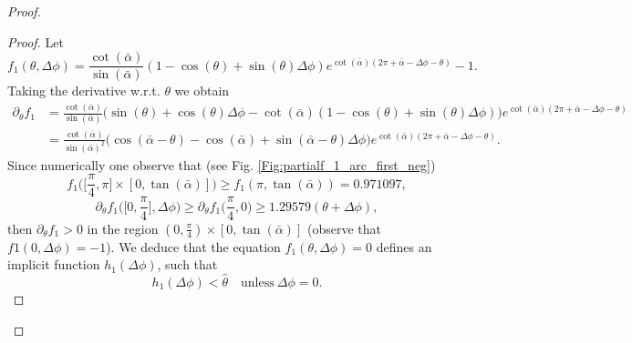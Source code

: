 \documentclass[reqno]{amsart}
\theoremstyle{definition} \newtheorem{definition}{Definition}[section]
\theoremstyle{definition} \newtheorem{remark}[definition]{Remark}
\theoremstyle{plain} \newtheorem{lemma}[definition]{Lemma}
\theoremstyle{plain} \newtheorem{proposition}[definition]{Proposition}
\theoremstyle{plain} \newtheorem{theorem}[definition]{Theorem}
\theoremstyle{plain} \newtheorem{corollary}[definition]{Corollary}
\theoremstyle{definition} \newtheorem{example}[definition]{Example}
\theoremstyle{plain} \newtheorem{claim}[clai]{Claim}
\theoremstyle{definition} \newtheorem{assumption}[definition]{Assumption}
\theoremstyle{definition} \newtheorem{observation}[definition]{Observation}
\newcommand{\1}{\mathbbm 1}
\numberwithin{equation}{section} %
\theoremstyle{plain} \newtheorem*{theorem*}{Theorem}
\theoremstyle{plain} \newtheorem{mthm}[maintheorem]{Main Theorem}
\theoremstyle{plain} \newtheorem*{mthm*}{Main Theorem}
\theoremstyle{plain} \newtheorem*{conjecture*}{Conjecture}
\theoremstyle{plain} \newtheorem{conjecture}[definition]{Conjecture}
\theoremstyle{plain} \newtheorem*{problem*}{Problem}
\begin{document}
\begin{proof}
\begin{proof}
Let
\begin{equation}
\label{Equa:f_1_arc_first_neg}
f_1(\theta,\Delta \phi) = \frac{\cot(\bar \alpha)}{\sin(\bar \alpha)} (1 - \cos(\theta) + \sin(\theta) \Delta \phi) e^{\cot(\bar \alpha) (2\pi + \bar \alpha - \Delta \phi - \theta)} - 1.
\end{equation}
Taking the derivative w.r.t. $\theta$ we obtain
\begin{equation}
\label{Equa:partialf_1_arc_first_neg}
\begin{split}
\partial_\theta f_1 &= \frac{\cot(\bar \alpha)}{\sin(\bar \alpha)} \big( \sin(\theta) + \cos(\theta) \Delta \phi - \cot(\bar \alpha) (1 - \cos(\theta) + \sin(\theta) \Delta \phi) \big) e^{\cot(\bar \alpha) (2\pi + \bar \alpha - \Delta \phi - \theta)} \\
&= \frac{\cot(\bar \alpha)}{\sin(\bar \alpha)^2} \big( \cos(\bar \alpha - \theta) - \cos(\bar \alpha) + \sin(\bar \alpha - \theta) \Delta \phi \big) e^{\cot(\bar \alpha) (2\pi + \bar \alpha - \Delta \phi - \theta)}.
\end{split}
\end{equation}
Since numerically one observe that (see Fig. \ref{Fig:partialf_1_arc_first_neg})
\begin{equation*}
f_1 \bigg( \bigg[ \frac{\pi}{4}, \pi \bigg] \times [0,\tan(\bar \alpha)] \bigg) \geq f_1(\pi,\tan(\bar \alpha)) = 0.971097,
\end{equation*}
\begin{equation*}
\partial_\theta f_1 \bigg( \bigg[0,\frac{\pi}{4} \bigg],\Delta \phi \bigg) \geq \partial_\theta f_1 \bigg( \frac{\pi}{4},0 \bigg) \geq 1.29579 (\theta + \Delta \phi),
\end{equation*}
then $\partial_\theta f_1 > 0$ in the region $(0,\frac{\pi}{4}) \times [0,\tan(\bar \alpha)]$ (observe that $f1(0,\Delta \phi) = -1$). We deduce that the equation $f_1(\theta,\Delta \phi) = 0$ defines an implicit function $h_1(\Delta \phi)$, such that
\begin{equation*}
h_1(\Delta \phi) < \hat \theta \quad \text{unless} \ \Delta \phi = 0.
\end{equation*}


\end{proof}
\end{proof}
\end{document}
